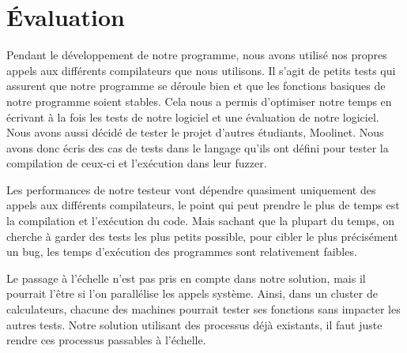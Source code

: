 \chapter{Évaluation}

Pendant le développement de notre programme, nous avons utilisé nos propres appels aux différents compilateurs que nous utilisons. Il s'agit de petits
tests qui assurent que notre programme se déroule bien et que les fonctions basiques de notre programme soient stables. Cela nous a permis d'optimiser
notre temps en écrivant à la fois les tests de notre logiciel et une évaluation de notre logiciel. Nous avons aussi décidé de tester le projet
d'autres étudiants, Moolinet. Nous avons donc écris des cas de tests dans le langage qu'ils ont défini pour tester la compilation de ceux-ci et l’exécution
dans leur fuzzer.

Les performances de notre testeur vont dépendre quasiment uniquement des appels aux différents compilateurs, le point
qui peut prendre le plus de temps est la compilation et l’exécution du code. Mais sachant que la plupart du temps,
on cherche à garder des tests les plus petits possible, pour cibler le plus précisément un bug, les temps d'exécution des programmes sont
relativement faibles.

Le passage à l'échelle n'est pas pris en compte dans notre solution, mais il pourrait
l'être si l'on parallélise les appels système. Ainsi, dans un cluster de calculateurs,
chacune des machines pourrait tester ses fonctions sans impacter les autres tests. Notre
solution utilisant des processus déjà existants, il faut juste rendre ces processus
passables à l'échelle.
